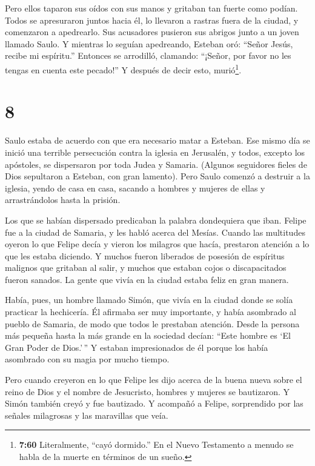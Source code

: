  Pero ellos taparon sus oídos con sus manos y gritaban tan
fuerte como podían. Todos se apresuraron juntos hacia él, 
lo llevaron a rastras fuera de la ciudad, y comenzaron a apedrearlo. Sus
acusadores pusieron sus abrigos junto a un joven llamado Saulo.
 Y mientras lo seguían apedreando, Esteban oró: ``Señor
Jesús, recibe mi espíritu.''  Entonces se arrodilló,
clamando: ``¡Señor, por favor no les tengas en cuenta este pecado!'' Y
después de decir esto, murió\footnote{\textbf{7:60} Literalmente, ``cayó
  dormido.'' En el Nuevo Testamento a menudo se habla de la muerte en
  términos de un sueño.}.

\hypertarget{section-7}{%
\section{8}\label{section-7}}

 Saulo estaba de acuerdo con que era necesario matar a
Esteban. Ese mismo día se inició una terrible persecución contra la
iglesia en Jerusalén, y todos, excepto los apóstoles, se dispersaron por
toda Judea y Samaria.  (Algunos seguidores fieles de Dios
sepultaron a Esteban, con gran lamento).  Pero Saulo comenzó
a destruir a la iglesia, yendo de casa en casa, sacando a hombres y
mujeres de ellas y arrastrándolos hasta la prisión.

 Los que se habían dispersado predicaban la palabra
dondequiera que iban.  Felipe fue a la ciudad de Samaria, y
les habló acerca del Mesías.  Cuando las multitudes oyeron
lo que Felipe decía y vieron los milagros que hacía, prestaron atención
a lo que les estaba diciendo.  Y muchos fueron liberados de
posesión de espíritus malignos que gritaban al salir, y muchos que
estaban cojos o discapacitados fueron sanados.  La gente que
vivía en la ciudad estaba feliz en gran manera.

 Había, pues, un hombre llamado Simón, que vivía en la
ciudad donde se solía practicar la hechicería. Él afirmaba ser muy
importante, y había asombrado al pueblo de Samaria,  de
modo que todos le prestaban atención. Desde la persona más pequeña hasta
la más grande en la sociedad decían: ``Este hombre es `El Gran Poder de
Dios.'\,''  Y estaban impresionados de él porque los había
asombrado con su magia por mucho tiempo.

 Pero cuando creyeron en lo que Felipe les dijo acerca de
la buena nueva sobre el reino de Dios y el nombre de Jesucristo, hombres
y mujeres se bautizaron.  Y Simón también creyó y fue
bautizado. Y acompañó a Felipe, sorprendido por las señales milagrosas y
las maravillas que veía.

